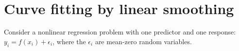 \documentclass[11pt]{article}
\newtheorem{theorem}{Theorem}
\begin{document}
%


\section{Curve fitting by linear smoothing}

Consider a nonlinear regression problem with one predictor and one response: $y_i = f(x_i) + \epsilon_i$, where the $\epsilon_i$ are mean-zero random variables.
\end{document}
